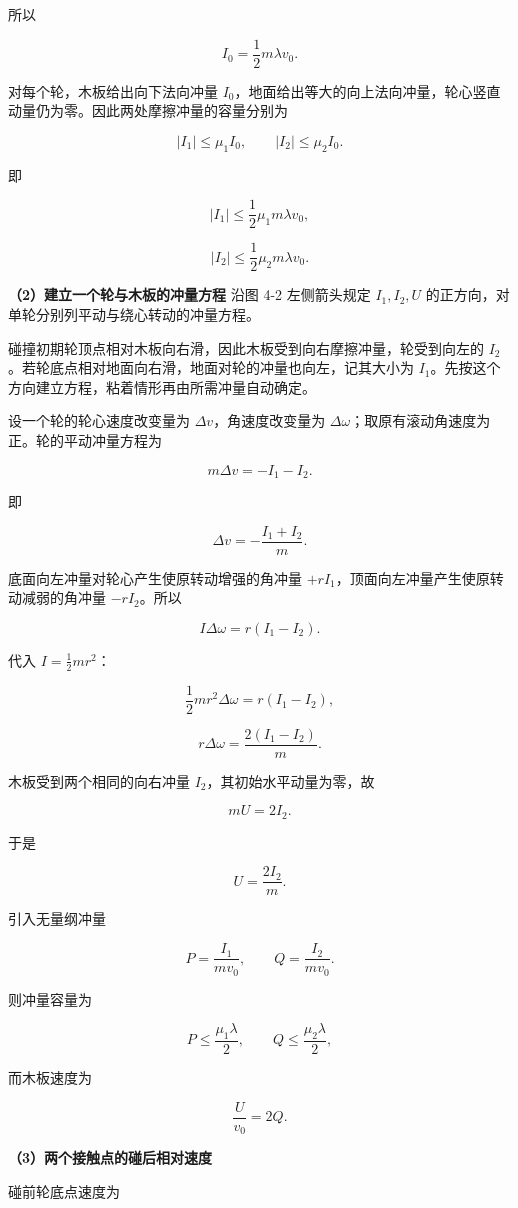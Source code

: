 \documentclass[12pt,a4paper,UTF8]{ctexart}
\begin{document}
所以

\[\boxed{I_0=\frac12m\lambda v_0}.\]

对每个轮，木板给出向下法向冲量
\(I_0\)，地面给出等大的向上法向冲量，轮心竖直动量仍为零。因此两处摩擦冲量的容量分别为

\[|I_1|\le\mu_1I_0,
\qquad
|I_2|\le\mu_2I_0.\]

即

\[|I_1|\le\frac12\mu_1m\lambda v_0,\]

\[|I_2|\le\frac12\mu_2m\lambda v_0.\]

\textbf{（2）建立一个轮与木板的冲量方程} 沿图 4-2 左侧箭头规定
\(I_1,I_2,U\) 的正方向，对单轮分别列平动与绕心转动的冲量方程。

碰撞初期轮顶点相对木板向右滑，因此木板受到向右摩擦冲量，轮受到向左的
\(I_2\)。若轮底点相对地面向右滑，地面对轮的冲量也向左，记其大小为
\(I_1\)。先按这个方向建立方程，粘着情形再由所需冲量自动确定。

设一个轮的轮心速度改变量为 \(\Delta v\)，角速度改变量为
\(\Delta\omega\)；取原有滚动角速度为正。轮的平动冲量方程为

\[m\Delta v=-I_1-I_2.\]

即

\[\Delta v=-\frac{I_1+I_2}{m}.\]

底面向左冲量对轮心产生使原转动增强的角冲量
\(+rI_1\)，顶面向左冲量产生使原转动减弱的角冲量 \(-rI_2\)。所以

\[I\Delta\omega=r(I_1-I_2).\]

代入 \(I=\frac12mr^2\)：

\[\frac12mr^2\Delta\omega=r(I_1-I_2),\]

\[r\Delta\omega=\frac{2(I_1-I_2)}m.\]

木板受到两个相同的向右冲量 \(I_2\)，其初始水平动量为零，故

\[mU=2I_2.\]

于是

\[\boxed{U=\frac{2I_2}{m}}.\]

引入无量纲冲量

\[P=\frac{I_1}{mv_0},
\qquad
Q=\frac{I_2}{mv_0}.\]

则冲量容量为

\[P\le\frac{\mu_1\lambda}{2},
\qquad
Q\le\frac{\mu_2\lambda}{2},\]

而木板速度为

\[\boxed{\frac U{v_0}=2Q}.\]

\textbf{（3）两个接触点的碰后相对速度}

碰前轮底点速度为
\end{document}
